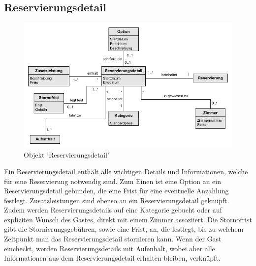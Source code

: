 \documentclass[../../Pflichtenheft.tex]{subfiles}
\begin{document}
    \subsection{Reservierungsdetail}
    \begin{figure}[ht!]
        \begin{center}
            \includegraphics[width=0.5\linewidth]{assets/reservierungDetail.png}
            \caption{Objekt 'Reservierungsdetail'} \label{reservierungDetail_model}
        \end{center}
    \end{figure}
    Ein Reservierungsdetail enthält alle wichtigen Details und Informationen, welche für eine
    Reservierung notwendig sind. Zum Einen ist eine Option an ein Reservierungsdetail gebunden, die
    eine Frist für eine eventuelle Anzahlung festlegt. Zusatzleistungen sind ebenso an ein Reservierungsdetail
    geknüpft. Zudem werden Reservierungsdetails auf eine Kategorie gebucht oder auf expliziten Wunsch des
    Gastes, direkt mit einem Zimmer assoziiert. Die Stornofrist gibt die Stornierungsgebühren, sowie eine Frist,
    an, die festlegt, bis zu welchem Zeitpunkt man das Reservierungsdetail stornieren kann. Wenn der Gast
    eincheckt, werden Reservierungsdetails mit Aufenhalt, wobei aber alle Informationen aus dem Reservierungsdetail erhalten bleiben, verknüpft.
\end{document}
